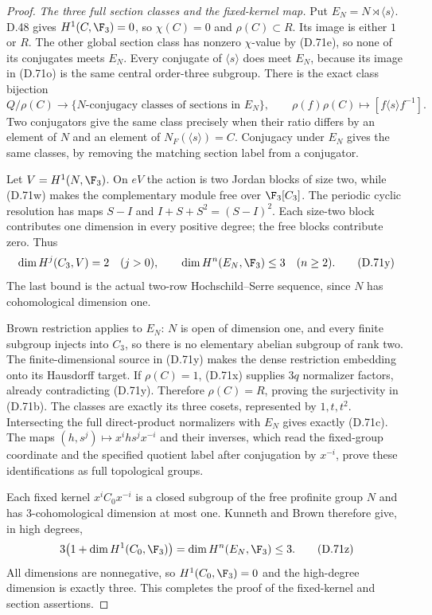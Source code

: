 \begin{proof}
\emph{The three full section classes and the fixed-kernel map.}
Put $E_N=N\rtimes\langle s\rangle$.
D.48 gives $H^1(C,\F_3)=0$,
so $\chi(C)=0$ and $\rho(C)\subset R$.
Its image is either $1$ or $R$.
The other global section class has
nonzero $\chi$-value by (D.71e),
so none of its conjugates meets $E_N$.
Every conjugate of $\langle s\rangle$
does meet $E_N$, because its image
in (D.71o) is the same central
order-three subgroup.
There is the exact class bijection
\[
 Q/\rho(C)\longrightarrow
 \{\text{$N$-conjugacy classes of sections in }E_N\},
 \qquad
 \rho(f)\rho(C)\longmapsto[f\langle s\rangle f^{-1}].
                                                               \tag{D.71x}
\]
Two conjugators give the same class
precisely when their ratio differs by
an element of $N$ and an element of
$N_F(\langle s\rangle)=C$.
Conjugacy under $E_N$ gives the same
classes, by removing the matching
section label from a conjugator.

Let $V=H^1(N,\F_3)$.
On $eV$ the action is two Jordan
blocks of size two, while (D.71w)
makes the complementary module free
over $\F_3[C_3]$.
The periodic cyclic resolution has
maps $S-I$ and
$I+S+S^2=(S-I)^2$.
Each size-two block contributes one
dimension in every positive degree;
the free blocks contribute zero.
Thus
\[
          \dim H^j(C_3,V)=2\quad(j>0),\qquad
          \dim H^n(E_N,\F_3)\leq3\quad(n\geq2).
                                                               \tag{D.71y}
\]
The last bound is the actual two-row
Hochschild--Serre sequence, since $N$
has cohomological dimension one.

Brown restriction applies to $E_N$:
$N$ is open of dimension one, and
every finite subgroup injects into
$C_3$, so there is no elementary
abelian subgroup of rank two.
The finite-dimensional source in
(D.71y) makes the dense restriction
embedding onto its Hausdorff target.
If $\rho(C)=1$, (D.71x) supplies
$3q$ normalizer factors, already
contradicting (D.71y).
Therefore $\rho(C)=R$, proving the
surjectivity in (D.71b).
The classes are exactly its three
cosets, represented by $1,t,t^2$.
Intersecting the full direct-product
normalizers with $E_N$ gives
exactly (D.71c).
The maps
$(h,s^j)\mapsto x^ihs^jx^{-i}$
and their inverses, which read
the fixed-group coordinate and the
specified quotient label after
conjugation by $x^{-i}$, prove
these identifications as full
topological groups.

Each fixed kernel $x^iC_0x^{-i}$
is a closed subgroup of the free
profinite group $N$ and has
$3$-cohomological dimension at most
one. Kunneth and Brown therefore give,
in high degrees,
\[
 3\bigl(1+\dim H^1(C_0,\F_3)\bigr)
                  =\dim H^n(E_N,\F_3)\leq3.
                                                               \tag{D.71z}
\]
All dimensions are nonnegative,
so $H^1(C_0,\F_3)=0$ and the
high-degree dimension is exactly
three. This completes the proof
of the fixed-kernel and section
assertions.


\end{proof}
